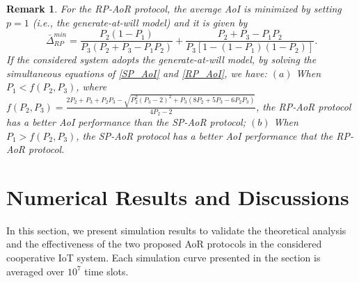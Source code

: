 \documentclass{IEEEtran}
\newtheorem{remark}{Remark}
\begin{document}
\begin{remark}\label{remark_2}
		For the RP-AoR protocol, the average AoI is minimized by setting $p=1$ (i.e., the generate-at-will model) and it is given by 
		\begin{equation}\label{RP_AoI}
		\bar{\Delta}^{min}_{RP}\!=\!\frac{P_2(1\!-\!P_1)}{P_3(P_2\!+\!P_3\!-\!P_1P_2)}\!+\!\frac{P_2\!+\!P_3\!-\!P_1P_2}{P_3[1\!-\!(1\!-\!P_1)(1\!-\!P_2)]}.
		\end{equation}
		If the considered system adopts the generate-at-will model, by solving the simultaneous equations of \eqref{SP_AoI} and \eqref{RP_AoI}, we have: $(a)$ When $P_1<f(P_2,P_3)$, where $f(P_2,P_3)=\frac{2P_2+P_3+P_2P_3-\sqrt{P_2^2(P_3-2)^2+P_3(8P_2+5P_3-6P_2P_3)}}{4P_2-2}$, the RP-AoR protocol has a better AoI performance than the SP-AoR protocol; $(b)$ When $P_1>f(P_2,P_3)$, the SP-AoR protocol has a better AoI performance that the RP-AoR protocol.	
		
		
\end{remark}


\section{Numerical Results and Discussions}
In this section, we present simulation results to validate the theoretical analysis and the effectiveness of the two proposed AoR protocols in the considered cooperative IoT  system. Each simulation curve presented in the section is averaged over $10^7$ time slots.
\end{document}
